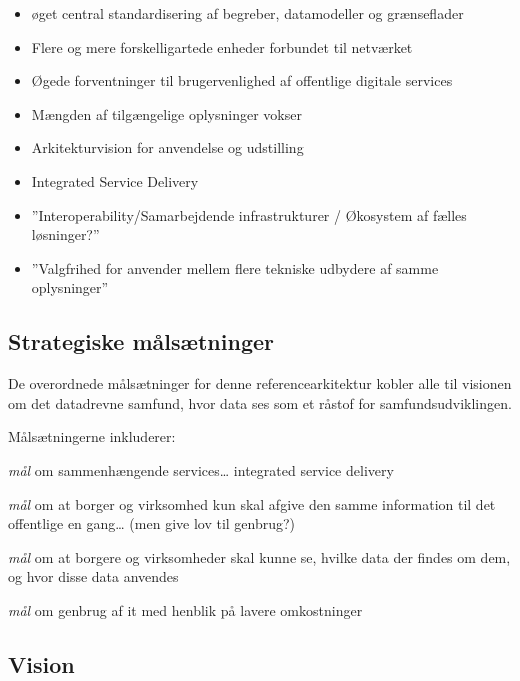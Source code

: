\begin{itemize}
\tightlist
\item
  øget central standardisering af begreber, datamodeller og grænseflader
\item
  Flere og mere forskelligartede enheder forbundet til netværket
\item
  Øgede forventninger til brugervenlighed af offentlige digitale
  services
\item
  Mængden af tilgængelige oplysninger vokser
\item
  Arkitekturvision for anvendelse og udstilling
\item
  Integrated Service Delivery
\item
  ''Interoperability/Samarbejdende infrastrukturer / Økosystem af fælles
  løsninger?''
\item
  ''Valgfrihed for anvender mellem flere tekniske udbydere af samme
  oplysninger''
\end{itemize}

\subsection{Strategiske
målsætninger}\label{strategiske-muxe5lsuxe6tninger}

De overordnede målsætninger for denne referencearkitektur kobler alle
til visionen om det datadrevne samfund, hvor data ses som et råstof for
samfundsudviklingen.

Målsætningerne inkluderer:

\begin{description}
\tightlist
\item[Interoperabilitet]
\emph{mål} om sammenhængende services\ldots{} integrated service
delivery
\item[Once-only]
\emph{mål} om at borger og virksomhed kun skal afgive den samme
information til det offentlige en gang\ldots{} (men give lov til
genbrug?)
\item[Transparens]
\emph{mål} om at borgere og virksomheder skal kunne se, hvilke data der
findes om dem, og hvor disse data anvendes
\item[Genbrug]
\emph{mål} om genbrug af it med henblik på lavere omkostninger
\end{description}

\subsection{Vision}\label{vision}

